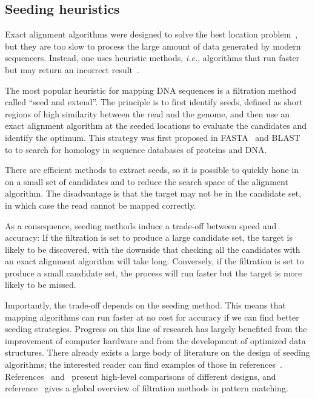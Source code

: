 \documentclass{article}
\begin{document}
\subsection{Seeding heuristics}
\label{sec:seedheur}

Exact alignment algorithms were designed to solve the best location
problem~\cite{pmid7265238, pmid5420325}, but they are too slow to process
the large amount of data generated by modern sequencers. Instead, one uses
heuristic methods, \textit{i.e.}, algorithms that run faster but may
return an incorrect result~\cite{Waterman1984}.

The most popular heuristic for mapping DNA sequences is a filtration
method called ``seed and extend''. The principle is to first identify
seeds, defined as short regions of high similarity between the read and
the genome, and then use an exact alignment algorithm at the seeded
locations to evaluate the candidates and identify the optimum. This
strategy was first proposed in FASTA~\cite{pmid2983426} and
BLAST~\cite{pmid2231712} to to search for homology in sequence databases
of proteins and DNA.

There are efficient methods to extract seeds, so it is possible to quickly
hone in on a small set of candidates and to reduce the search space of the
alignment algorithm. The disadvantage is that the target may not be in the
candidate set, in which case the read cannot be mapped correctly.

As a consequence, seeding methods induce a trade-off between speed and
accuracy: If the filtration is set to produce a large candidate set, the
target is likely to be discovered, with the downside that checking all the
candidates with an exact alignment algorithm will take long. Conversely,
if the filtration is set to produce a small candidate set, the process
will run faster but the target is more likely to be missed.

Importantly, the trade-off depends on the seeding method. This means that
mapping algorithms can run faster at no cost for accuracy if we can find
better seeding strategies. Progress on this line of research has largely
benefited from the improvement of computer hardware and from the
development of optimized data structures. There already exists a large
body of literature on the design of seeding algorithms; the interested
reader can find examples of those in references~\cite{sun2005designing,
pmid11934743, xu2006optimizing, kucherov2005multiseed, brejova2003vector,
pmid18684737, pmid15359419}. References~\cite{pmid16533404}
and~\cite{pmid20460430} present high-level comparisons of different
designs, and reference~\cite{navarro2001guided} gives a global overview of
filtration methods in pattern matching.
\end{document}
